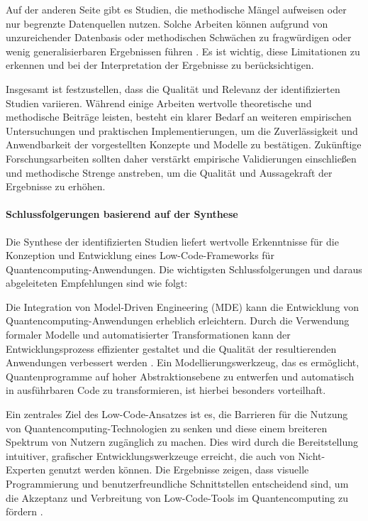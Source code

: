 Auf der anderen Seite gibt es Studien, die methodische Mängel aufweisen oder nur begrenzte Datenquellen nutzen. Solche 
Arbeiten können aufgrund von unzureichender Datenbasis oder methodischen Schwächen zu fragwürdigen oder wenig 
generalisierbaren Ergebnissen führen \cite{Khorram_2020}. Es ist wichtig, diese Limitationen zu erkennen und bei 
der Interpretation der Ergebnisse zu berücksichtigen.

Insgesamt ist festzustellen, dass die Qualität und Relevanz der identifizierten Studien variieren. Während einige 
Arbeiten wertvolle theoretische und methodische Beiträge leisten, besteht ein klarer Bedarf an weiteren empirischen 
Untersuchungen und praktischen Implementierungen, um die Zuverlässigkeit und Anwendbarkeit der vorgestellten Konzepte 
und Modelle zu bestätigen. Zukünftige Forschungsarbeiten sollten daher verstärkt empirische Validierungen einschließen 
und methodische Strenge anstreben, um die Qualität und Aussagekraft der Ergebnisse zu erhöhen. 

\paragraph{Schlussfolgerungen basierend auf der Synthese}

Die Synthese der identifizierten Studien liefert wertvolle Erkenntnisse für die Konzeption und Entwicklung eines Low-Code-Frameworks 
für Quantencomputing-Anwendungen. Die wichtigsten Schlussfolgerungen und daraus abgeleiteten Empfehlungen sind wie folgt:

Die Integration von Model-Driven Engineering (MDE) kann die Entwicklung von Quantencomputing-Anwendungen erheblich erleichtern. 
Durch die Verwendung formaler Modelle und automatisierter Transformationen kann der Entwicklungsprozess effizienter gestaltet 
und die Qualität der resultierenden Anwendungen verbessert werden \cite{France_2007, Selic_2003}. Ein Modellierungswerkzeug, 
das es ermöglicht, Quantenprogramme auf hoher Abstraktionsebene zu entwerfen und automatisch in ausführbaren Code zu transformieren, 
ist hierbei besonders vorteilhaft.

Ein zentrales Ziel des Low-Code-Ansatzes ist es, die Barrieren für die Nutzung von Quantencomputing-Technologien zu senken und 
diese einem breiteren Spektrum von Nutzern zugänglich zu machen. Dies wird durch die Bereitstellung intuitiver, grafischer 
Entwicklungswerkzeuge erreicht, die auch von Nicht-Experten genutzt werden können. Die Ergebnisse zeigen, dass visuelle 
Programmierung und benutzerfreundliche Schnittstellen entscheidend sind, um die Akzeptanz und Verbreitung von Low-Code-Tools 
im Quantencomputing zu fördern \cite{Khorram_2020}.

